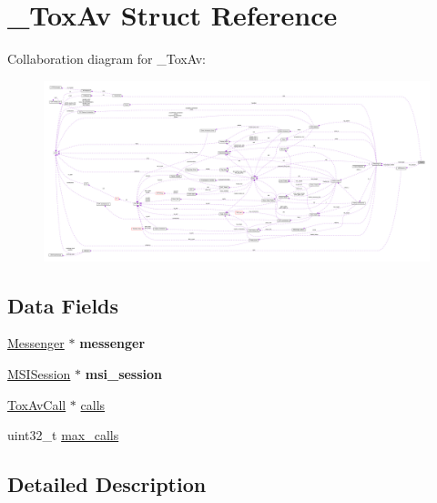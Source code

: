\hypertarget{struct___tox_av}{\section{\+\_\+\+Tox\+Av Struct Reference}
\label{struct___tox_av}
}


Collaboration diagram for \+\_\+\+Tox\+Av\+:
\nopagebreak
\begin{figure}[H]
\begin{center}
\leavevmode
\includegraphics[width=350pt]{struct___tox_av__coll__graph}
\end{center}
\end{figure}
\subsection*{Data Fields}
\begin{DoxyCompactItemize}
\item 
\hypertarget{struct___tox_av_a48342badc24a04d2310ca16ff4a3711b}{\hyperlink{struct_messenger}{Messenger} $\ast$ {\bfseries messenger}}\label{struct___tox_av_a48342badc24a04d2310ca16ff4a3711b}

\item 
\hypertarget{struct___tox_av_a85e3d7dd2ab722ee5ba0cd4b72bc7d60}{\hyperlink{struct___m_s_i_session}{M\+S\+I\+Session} $\ast$ {\bfseries msi\+\_\+session}}\label{struct___tox_av_a85e3d7dd2ab722ee5ba0cd4b72bc7d60}

\item 
\hyperlink{struct___tox_av_call}{Tox\+Av\+Call} $\ast$ \hyperlink{struct___tox_av_abe854f89ac28ebd5112d1639d531b128}{calls}
\item 
uint32\+\_\+t \hyperlink{struct___tox_av_a7d6cf32eb812384ebd4074c588c17499}{max\+\_\+calls}
\end{DoxyCompactItemize}


\subsection{Detailed Description}


